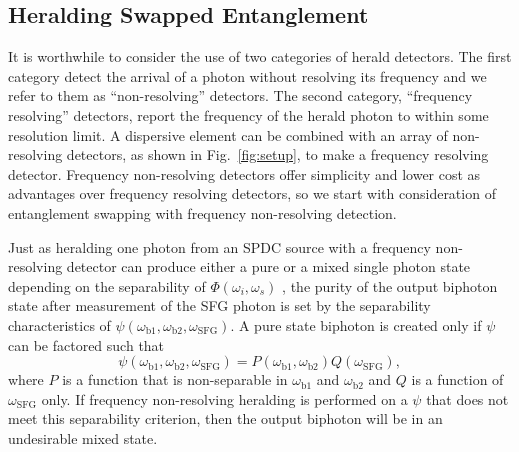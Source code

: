 \documentclass[twocolumn,amssymb, nobibnotes, showpacs, aps, pra,10pt]{revtex4-1}
\newcommand*{\wi}{\omega_{i}}
\newcommand*{\ws}{\omega_{s}}
\newcommand*{\wbone}{\omega_{\textrm{b}1}}
\newcommand*{\wbtwo}{\omega_{\textrm{b}2}}
\newcommand*{\wsfg}{\omega_\textrm{SFG}}
\begin{document}
\subsection{Heralding Swapped Entanglement}
It is worthwhile to consider the use of two categories of herald detectors. The first category detect the arrival of a photon without resolving its frequency and we refer to them as ``non-resolving'' detectors. The second category, ``frequency resolving'' detectors, report the frequency of the herald photon to within some resolution limit. A dispersive element can be combined with an array of non-resolving detectors, as shown in Fig.\ \ref{fig:setup}, to make a frequency resolving detector. Frequency non-resolving detectors offer simplicity and lower cost as advantages over frequency resolving detectors, so we start with consideration of entanglement swapping with frequency non-resolving detection.

Just as heralding one photon from an SPDC source with a frequency non-resolving detector can produce either a pure or a mixed single photon state depending on the separability of $\Phi(\wi,\ws)$ \cite{URen2005,Smith2009}, the purity of the output biphoton state after measurement of the SFG photon is set by the  separability characteristics of $\psi(\wbone,\wbtwo,\wsfg)$. A pure state biphoton is created only if $\psi$ can be factored such that
\begin{equation} \label{eq:separabilityCrit}
\psi(\wbone,\wbtwo,\wsfg)=P(\wbone,\wbtwo)Q(\wsfg),
\end{equation}
where $P$ is a function that is non-separable in $\wbone$ and $\wbtwo$ and $Q$ is a function of $\wsfg$ only. If frequency non-resolving heralding is performed on a $\psi$ that does not meet this separability criterion, then the output biphoton will be in an undesirable mixed state.
\end{document}
